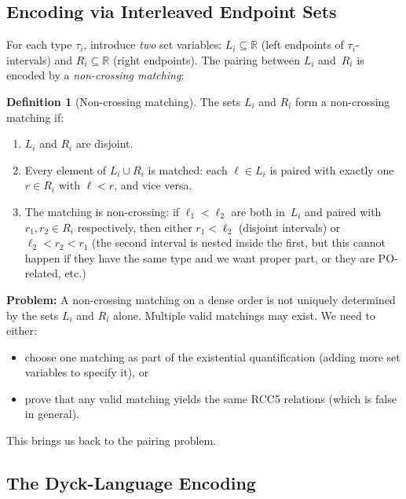 \documentclass[a4paper,11pt]{article}
\theoremstyle{definition}
\newtheorem{definition}[theorem]{Definition}
\newcommand{\reals}{\ensuremath{\mathbb{R}}}
\begin{document}
\subsection{Encoding via Interleaved Endpoint Sets}
\label{sec:interleaved}

For each type $\tau_i$, introduce \emph{two} set variables:
$L_i \subseteq \reals$ (left endpoints of $\tau_i$-intervals) and
$R_i \subseteq \reals$ (right endpoints).  The pairing between
$L_i$ and~$R_i$ is encoded by a \emph{non-crossing matching}:

\begin{definition}[Non-crossing matching]
\label{def:non-crossing}
The sets $L_i$ and $R_i$ form a non-crossing matching if:
\begin{enumerate}[nosep,label=(\alph*)]
  \item $L_i$ and $R_i$ are disjoint.
  \item Every element of $L_i \cup R_i$ is matched: each
    $\ell \in L_i$ is paired with exactly one $r \in R_i$ with
    $\ell < r$, and vice versa.
  \item The matching is non-crossing: if $\ell_1 < \ell_2$ are both
    in~$L_i$ and paired with $r_1, r_2 \in R_i$ respectively, then
    either $r_1 < \ell_2$ (disjoint intervals) or $\ell_2 < r_2 < r_1$
    (the second interval is nested inside the first, but this cannot
    happen if they have the same type and we want proper part, or they
    are PO-related, etc.)
\end{enumerate}
\end{definition}

\textbf{Problem:}\; A non-crossing matching on a dense order is not
uniquely determined by the sets $L_i$ and $R_i$ alone.  Multiple
valid matchings may exist.  We need to either:
\begin{itemize}[nosep]
  \item choose one matching as part of the existential quantification
    (adding more set variables to specify it), or
  \item prove that any valid matching yields the same RCC5 relations
    (which is false in general).
\end{itemize}

This brings us back to the pairing problem.

\subsection{The Dyck-Language Encoding}
\label{sec:dyck}
\end{document}
